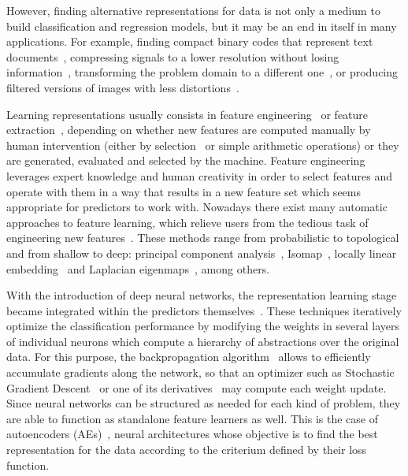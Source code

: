 However, finding alternative representations for data is not only a medium to build classification and regression models, but it may be an end in itself in many applications. For example, finding compact binary codes that represent text documents~, compressing signals to a lower resolution without losing information~, transforming the problem domain to a different one~, or producing filtered versions of images with less distortions~.

Learning representations usually consists in feature engineering~ or feature extraction~, depending on whether new features are computed manually by human intervention (either by selection~ or simple arithmetic operations) or they are generated, evaluated and selected by the machine. Feature engineering leverages expert knowledge and human creativity in order to select features and operate with them in a way that results in a new feature set which seems appropriate for predictors to work with. Nowadays there exist many automatic approaches to feature learning, which relieve users from the tedious task of engineering new features~. These methods range from probabilistic to topological and from shallow to deep: principal component analysis~, Isomap~, locally linear embedding~ and Laplacian eigenmaps~, among others.

With the introduction of deep neural networks, the representation learning stage became integrated within the predictors themselves~. These techniques iteratively optimize the classification performance by modifying the weights in several layers of individual neurons which compute a hierarchy of abstractions over the original data. For this purpose, the backpropagation algorithm~ allows to efficiently accumulate gradients along the network, so that an optimizer such as Stochastic Gradient Descent~ or one of its derivatives~ may compute each weight update. Since neural networks can be structured as needed for each kind of problem, they are able to function as standalone feature learners as well. This is the case of autoencoders (AEs)~, neural architectures whose objective is to find the best representation for the data according to the criterium defined by their loss function.

